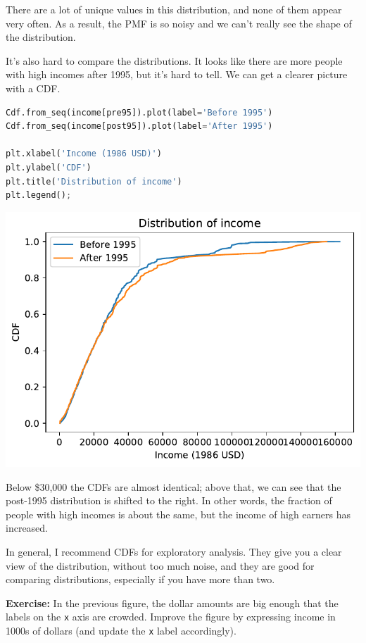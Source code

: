 There are a lot of unique values in this distribution, and none of them
appear very often. As a result, the PMF is so noisy and we can't really
see the shape of the distribution.

It's also hard to compare the distributions. It looks like there are
more people with high incomes after 1995, but it's hard to tell. We can
get a clearer picture with a CDF.

\begin{lstlisting}[language=Python]
Cdf.from_seq(income[pre95]).plot(label='Before 1995')
Cdf.from_seq(income[post95]).plot(label='After 1995')

plt.xlabel('Income (1986 USD)')
plt.ylabel('CDF')
plt.title('Distribution of income')
plt.legend();
\end{lstlisting}

\begin{center}
\includegraphics[scale=0.75]{chapters/08_distributions_files/08_distributions_104_0.pdf}
\end{center}

Below \$30,000 the CDFs are almost identical; above that, we can see
that the post-1995 distribution is shifted to the right. In other words,
the fraction of people with high incomes is about the same, but the
income of high earners has increased.

In general, I recommend CDFs for exploratory analysis. They give you a
clear view of the distribution, without too much noise, and they are
good for comparing distributions, especially if you have more than two.

\textbf{Exercise:} In the previous figure, the dollar amounts are big
enough that the labels on the \passthrough{\lstinline!x!} axis are
crowded. Improve the figure by expressing income in 1000s of dollars
(and update the \passthrough{\lstinline!x!} label accordingly).


